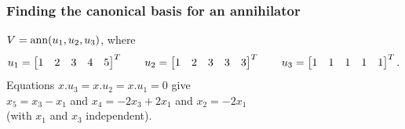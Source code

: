 \documentclass[9pt]{beamer}
\begin{document}
\begin{frame}[t]
 \frametitle{Finding the canonical basis for an annihilator}
 $V=\operatorname{ann}(u_1,u_2,u_3)$, where 
 \[
  u_1 = \left[\begin{matrix} 1 & 2 & 3 & 4 & 5 \end{matrix}\right]^T \qquad
  u_2 = \left[\begin{matrix} 1 & 2 & 3 & 3 & 3 \end{matrix}\right]^T \qquad
  u_3 = \left[\begin{matrix} 1 & 1 & 1 & 1 & 1 \end{matrix}\right]^T.
 \]
 Equations $x.u_3=x.u_2=x.u_1=0$ give \\
 $x_5=x_3-x_1$ and $x_4=-2x_3+2x_1$ and $x_2=-2x_1$ \\
 (with $x_1$ and $x_3$ independent).
 \reminderbar
\end{frame}
\end{document}
